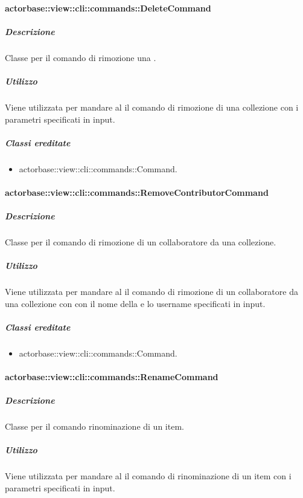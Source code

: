 \documentclass{scalatekids-article}
\begin{document}
\paragraph{actorbase::view::cli::commands::DeleteCommand}

\subparagraph{Descrizione}

Classe per il comando di rimozione una .

\subparagraph{Utilizzo}

Viene utilizzata per mandare al  il comando di rimozione di una collezione con i parametri specificati in input.

\subparagraph{Classi ereditate}

\begin{itemize}
\item actorbase::view::cli::commands::Command.
\end{itemize}

\paragraph{actorbase::view::cli::commands::RemoveContributorCommand}

\subparagraph{Descrizione}

Classe per il comando di rimozione di un collaboratore da una collezione.

\subparagraph{Utilizzo}

Viene utilizzata per mandare al  il comando di rimozione di un collaboratore da una collezione con con il nome della  e lo username specificati in input.

\subparagraph{Classi ereditate}

\begin{itemize}
\item actorbase::view::cli::commands::Command.
\end{itemize}

\paragraph{actorbase::view::cli::commands::RenameCommand}

\subparagraph{Descrizione}

Classe per il comando rinominazione di un item.

\subparagraph{Utilizzo}

Viene utilizzata per mandare al  il comando di rinominazione di un item con i parametri specificati in input.
\end{document}
